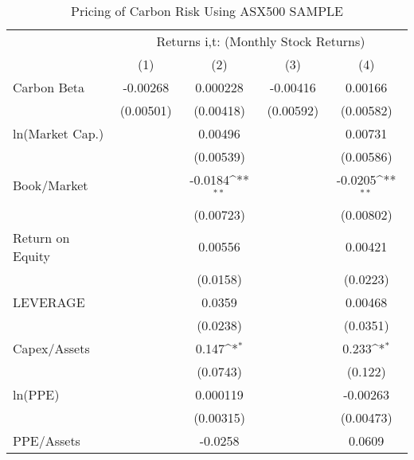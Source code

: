 
\normalsize
\begin{table}[htbp]\centering
\def\sym#1{\ifmmode^{#1}\else\(^{#1}\)\fi}
\caption{Pricing of Carbon Risk Using ASX500 SAMPLE}
\begin{tabular}{l*{4}{c}}
\hline\hline
                &\multicolumn{4}{c}{Returns i,t: (Monthly Stock Returns) }                  \\\cmidrule(lr){2-5}
                &\multicolumn{1}{c}{(1)}         &\multicolumn{1}{c}{(2)}         &\multicolumn{1}{c}{(3)}         &\multicolumn{1}{c}{(4)}         \\
\hline
Carbon Beta     & -0.00268         & 0.000228         & -0.00416         &  0.00166         \\
                &(0.00501)         &(0.00418)         &(0.00592)         &(0.00582)         \\
ln(Market Cap.) &                  &  0.00496         &                  &  0.00731         \\
                &                  &(0.00539)         &                  &(0.00586)         \\
Book/Market     &                  &  -0.0184\sym{**} &                  &  -0.0205\sym{**} \\
                &                  &(0.00723)         &                  &(0.00802)         \\
Return on Equity&                  &  0.00556         &                  &  0.00421         \\
                &                  & (0.0158)         &                  & (0.0223)         \\
LEVERAGE        &                  &   0.0359         &                  &  0.00468         \\
                &                  & (0.0238)         &                  & (0.0351)         \\
Capex/Assets    &                  &    0.147\sym{*}  &                  &    0.233\sym{*}  \\
                &                  & (0.0743)         &                  &  (0.122)         \\
ln(PPE)         &                  & 0.000119         &                  & -0.00263         \\
                &                  &(0.00315)         &                  &(0.00473)         \\
PPE/Assets      &                  &  -0.0258         &                  &   0.0609         \\

\end{tabular}
\end{table}
